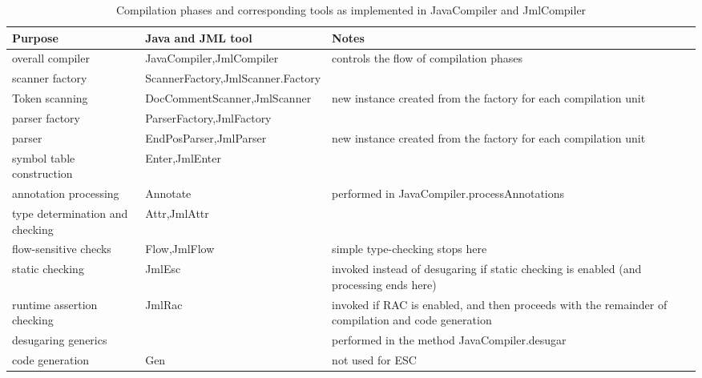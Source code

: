 \begin{table}
\begin{tabularx}{\textwidth}{|p{1.5in}|p{1.5in}|X|}

\hline
Purpose & Java and JML tool &  Notes \\
\hline
overall compiler & JavaCompiler,\newline JmlCompiler & controls the flow of compilation phases \\
\hline
scanner factory & ScannerFactory,\newline JmlScanner.Factory  & \\
\hline
Token scanning & DocCommentScanner,\newline JmlScanner &  new instance created from the factory for each compilation unit \\
\hline
parser factory & ParserFactory,\newline JmlFactory  & \\
\hline
parser & EndPosParser,\newline JmlParser & new instance created from the factory for each compilation unit \\
\hline
symbol table construction & Enter,\newline JmlEnter & \\
\hline
annotation processing & Annotate & performed in JavaCompiler.processAnnotations\\
\hline
type determination and checking & Attr,\newline JmlAttr & \\
\hline
flow-sensitive checks & Flow,\newline JmlFlow & simple type-checking stops here \\
\hline
\hline
static checking & \hspace{.1in} \newline JmlEsc & invoked instead of desugaring if static checking is enabled (and processing ends here) \\
\hline
\hline
runtime assertion checking & \hspace*{.1in}\newline JmlRac & invoked if RAC is enabled, and then proceeds with the remainder of compilation and code generation \\
\hline
desugaring generics & & performed in the method JavaCompiler.desugar \\
\hline
code generation & Gen & not used for ESC \\
\hline


\end{tabularx}
\caption{Compilation phases and corresponding tools as implemented in JavaCompiler and JmlCompiler}
\label{Tools1}
\end{table}

